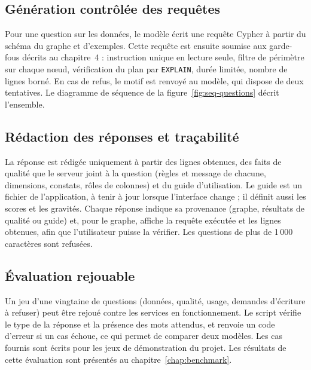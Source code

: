 \subsection{Génération contrôlée des requêtes}

Pour une question sur les données, le modèle écrit une requête Cypher à partir du schéma du graphe et d'exemples. Cette requête est ensuite soumise aux garde-fous décrits au chapitre~4 : instruction unique en lecture seule, filtre de périmètre sur chaque nœud, vérification du plan par \texttt{EXPLAIN}, durée limitée, nombre de lignes borné. En cas de refus, le motif est renvoyé au modèle, qui dispose de deux tentatives. Le diagramme de séquence de la figure~\ref{fig:seq-questions} décrit l'ensemble.


\subsection{Rédaction des réponses et traçabilité}

La réponse est rédigée uniquement à partir des lignes obtenues, des faits de qualité que le serveur joint à la question (règles et message de chacune, dimensions, constats, rôles de colonnes) et du guide d'utilisation. Le guide est un fichier de l'application, à tenir à jour lorsque l'interface change ; il définit aussi les scores et les gravités. Chaque réponse indique sa provenance (graphe, résultats de qualité ou guide) et, pour le graphe, affiche la requête exécutée et les lignes obtenues, afin que l'utilisateur puisse la vérifier. Les questions de plus de 1\,000 caractères sont refusées.

\subsection{Évaluation rejouable}

Un jeu d'une vingtaine de questions (données, qualité, usage, demandes d'écriture à refuser) peut être rejoué contre les services en fonctionnement. Le script vérifie le type de la réponse et la présence des mots attendus, et renvoie un code d'erreur si un cas échoue, ce qui permet de comparer deux modèles. Les cas fournis sont écrits pour les jeux de démonstration du projet. Les résultats de cette évaluation sont présentés au chapitre~\ref{chap:benchmark}.

